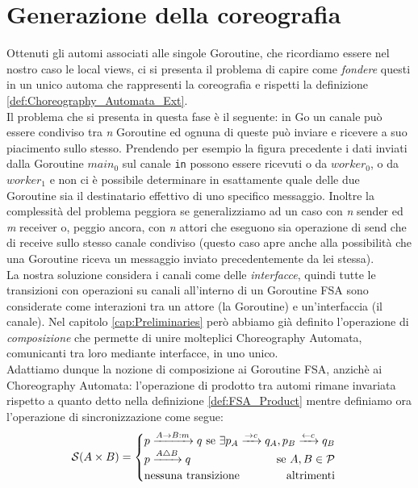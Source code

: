 \section{Generazione della coreografia} \label{sec:Go_Composition}
Ottenuti gli automi associati alle singole Goroutine, che ricordiamo essere nel nostro caso le local views, ci si presenta il problema di capire come \emph{fondere} questi in un unico automa che rappresenti la coreografia e rispetti la definizione \ref{def:Choreography_Automata_Ext}.\bigskip \\
Il problema che si presenta in questa fase è il seguente: in Go un canale può essere condiviso tra \emph{n} Goroutine ed ognuna di queste può inviare e ricevere a suo piacimento sullo stesso. Prendendo per esempio la figura precedente i dati inviati dalla Goroutine $main_0$ sul canale \texttt{in} possono essere ricevuti o da $worker_0$, o da $worker_1$ e non ci è possibile determinare in esattamente quale delle due Goroutine sia il destinatario effettivo di uno specifico messaggio. Inoltre la complessità del problema peggiora se generalizziamo ad un caso con \emph{n} sender ed \emph{m} receiver o, peggio ancora, con \emph{n} attori che eseguono sia operazione di send che di receive sullo stesso canale condiviso (questo caso apre anche alla possibilità che una Goroutine riceva un messaggio inviato precedentemente da lei stessa). \bigskip \\
La nostra soluzione considera i canali come delle \emph{interfacce}, quindi tutte le transizioni con operazioni su canali all'interno di un Goroutine FSA sono considerate come interazioni tra un attore (la Goroutine) e un'interfaccia (il canale). Nel capitolo \ref{cap:Preliminaries} però abbiamo già definito l'operazione di \emph{composizione} che permette di unire molteplici Choreography Automata, comunicanti tra loro mediante interfacce, in uno unico.\\
Adattiamo dunque la nozione di composizione ai Goroutine FSA, anzichè ai Choreography Automata: l'operazione di prodotto tra automi rimane invariata rispetto a quanto detto nella definizione \ref{def:FSA_Product} mentre definiamo ora l'operazione di sincronizzazione come segue:
\begin{equation*}
    \mathcal{S}(A \times B) =
    \begin{cases}
        p \xrightarrow{A \rightarrow B: m} q \hfill \text{ se } \exists p_A \xrightarrow{\rightarrow c} q_A,  p_B \xrightarrow{\leftarrow c} q_B \\
        p \xrightarrow{A \bigtriangleup B} q \hfill \text{ se } A, B\in \mathcal{P}                                                              \\
        \text{nessuna transizione} \hfill \text{altrimenti}
    \end{cases}
\end{equation*}
